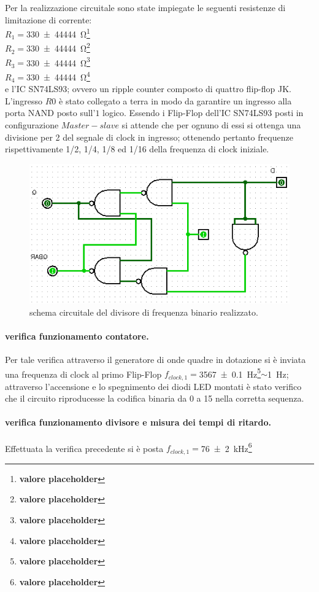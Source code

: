 \documentclass[a4paper,11pt]{article}
\newcommand{\p}{\footnote{\textbf{valore placeholder}}}
\begin{document}
	Per la realizzazione circuitale sono state impiegate le seguenti  resistenze di limitazione di corrente:
	\\$R_{1}=$\SI{330 \pm 44444}{\ohm}\p \\
	$R_{2}=$\SI{330 \pm 44444}{\ohm}\p \\
	$R_{3}=$\SI{330 \pm 44444}{\ohm}\p \\
	$R_{4}=$\SI{330 \pm 44444}{\ohm}\p \\
	e l'IC SN74LS93; ovvero un ripple counter composto di quattro flip-flop JK.
	L'ingresso $R0$ è stato collegato a terra in modo da garantire un ingresso alla porta NAND posto sull'$1$ logico.
	Essendo i Flip-Flop dell'IC SN74LS93 posti in configurazione $Master-slave$ 
	si attende che per ognuno di essi si ottenga una divisione per 2 del segnale di clock in ingresso; ottenendo pertanto frequenze rispettivamente 1/2, 1/4, 1/8 ed 1/16 della frequenza di
	clock iniziale.
	\begin{figure}[htb]
		\centering
		\includegraphics[scale=0.5]{../Figs-Tabs/placeholder.png}
		\caption{schema circuitale del divisore di frequenza binario realizzato.}
		\label{f:div1}
	\end{figure}
\paragraph{verifica funzionamento contatore.}
	Per tale verifica attraverso il generatore di onde quadre in dotazione 
	si è inviata una frequenza di clock al primo Flip-Flop $f_{clock,1}=$\SI{3567 \pm 0.1}{\hertz}\p$\sim$\SI{1}{\hertz};
	attraverso l'accensione e lo spegnimento dei diodi LED montati è stato verifico che il circuito riproducesse la codifica binaria da 0 a 15 nella corretta sequenza.
\paragraph{verifica funzionamento divisore e misura dei tempi di ritardo.}
	Effettuata la verifica precedente si è posta $f_{clock,1}=$\SI{76 \pm 2}{ \kilo \hertz}\p
\end{document}
